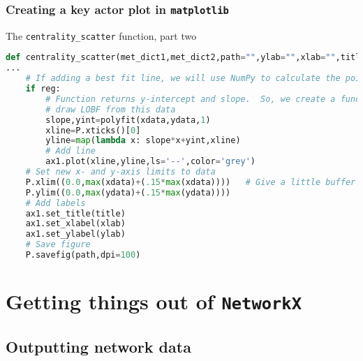 \documentclass[xcolor=dvipsnames, 9pt]{beamer}
\begin{document}
\begin{frame}[fragile]
    \frametitle{Creating a key actor plot in \texttt{matplotlib}}
    \begin{block}{The \texttt{centrality\_scatter} function, part two}
        \scriptsize{\begin{lstlisting}[language=Python]
def centrality_scatter(met_dict1,met_dict2,path="",ylab="",xlab="",title="",reg=False):
...
    # If adding a best fit line, we will use NumPy to calculate the points.
    if reg:
        # Function returns y-intercept and slope.  So, we create a function to 
        # draw LOBF from this data
        slope,yint=polyfit(xdata,ydata,1)
        xline=P.xticks()[0]
        yline=map(lambda x: slope*x+yint,xline)
        # Add line
        ax1.plot(xline,yline,ls='--',color='grey')
    # Set new x- and y-axis limits to data
    P.xlim((0.0,max(xdata)+(.15*max(xdata))))   # Give a little buffer
    P.ylim((0.0,max(ydata)+(.15*max(ydata))))
    # Add labels
    ax1.set_title(title)
    ax1.set_xlabel(xlab)
    ax1.set_ylabel(ylab)
    # Save figure
    P.savefig(path,dpi=100)
        \end{lstlisting}}
    \end{block}
    \scriptsize{\begin{itemize}
    \end{itemize}}
\end{frame}




\section{Getting things out of \texttt{NetworkX}} %
\label{sec:getting_things_out_of_networkx}

\subsection{Outputting network data} %
\label{sub:outputting_network_data}
\end{document}
